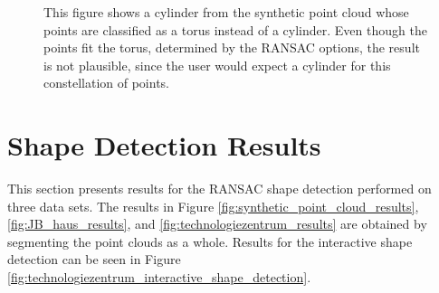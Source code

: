 \begin{figure}[h]
\centering
{}%
{}      
\caption[Implausible torus is detected instead of a more plausible cylinder. ]
{This figure shows a cylinder from the synthetic point cloud whose points are classified as a torus instead of a cylinder. Even though the points fit the torus, determined by the RANSAC options, the result is not plausible, since the user would expect a cylinder for this constellation of points. }
\label{fig:missfittedTorus}
\end{figure}


\section{Shape Detection Results}
\label{ref:shape_detection_results}

This section presents results for the RANSAC shape detection performed on three data sets. The results in Figure \ref{fig:synthetic_point_cloud_results}, \ref{fig:JB_haus_results}, and \ref{fig:technologiezentrum_results} are obtained by segmenting the point clouds as a whole. Results for the interactive shape detection can be seen in Figure \ref{fig:technologiezentrum_interactive_shape_detection}. 

